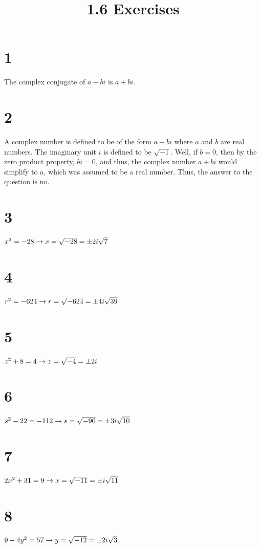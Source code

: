 \documentclass{article}
\title{1.6 Exercises}
\theoremstyle{definition}
\begin{document}
\maketitle

\section*{1}
The complex conjugate of $a-bi$ is $a+bi$.

\section*{2}
A complex number is defined to be of the form $a+bi$ where $a$ and $b$ are real numbers. The imaginary unit $i$ is defined to 
be $\sqrt{-1}$. Well, if $b=0$, then by the zero product property, $bi=0$, and thus, the complex number $a+bi$ would simplify to $a$, 
which was assumed to be a real number. Thus, the answer to the question is no.

\section*{3}
$x^2=-28\newline\rightarrow x=\sqrt{-28}=\pm 2i\sqrt{7}$

\section*{4}
$r^2=-624\newline\rightarrow r=\sqrt{-624}=\pm 4i\sqrt{39}$

\section*{5}
$z^2+8=4\newline\rightarrow z=\sqrt{-4}=\pm 2i$

\section*{6}
$s^2-22=-112\newline\rightarrow s=\sqrt{-90}=\pm 3i\sqrt{10}$

\section*{7}
$2x^2+31=9\newline\rightarrow x=\sqrt{-11}=\pm i\sqrt{11}$

\section*{8}
$9-4y^2=57\newline\rightarrow y=\sqrt{-12}=\pm 2i\sqrt{3}$
\end{document}
